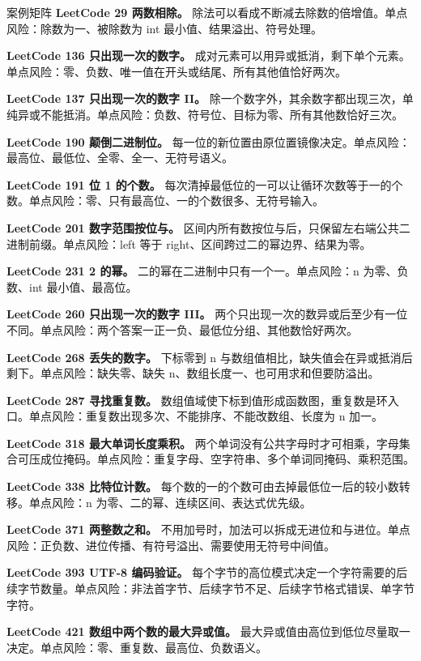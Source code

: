 \begin{principlebox}{案例矩阵}
\textbf{LeetCode 29 两数相除。}
除法可以看成不断减去除数的倍增值。单点风险：除数为一、被除数为 int 最小值、结果溢出、符号处理。

\textbf{LeetCode 136 只出现一次的数字。}
成对元素可以用异或抵消，剩下单个元素。单点风险：零、负数、唯一值在开头或结尾、所有其他值恰好两次。

\textbf{LeetCode 137 只出现一次的数字 II。}
除一个数字外，其余数字都出现三次，单纯异或不能抵消。单点风险：负数、符号位、目标为零、所有其他数恰好三次。

\textbf{LeetCode 190 颠倒二进制位。}
每一位的新位置由原位置镜像决定。单点风险：最高位、最低位、全零、全一、无符号语义。

\textbf{LeetCode 191 位 1 的个数。}
每次清掉最低位的一可以让循环次数等于一的个数。单点风险：零、只有最高位、一的个数很多、无符号输入。

\textbf{LeetCode 201 数字范围按位与。}
区间内所有数按位与后，只保留左右端公共二进制前缀。单点风险：left 等于 right、区间跨过二的幂边界、结果为零。

\textbf{LeetCode 231 2 的幂。}
二的幂在二进制中只有一个一。单点风险：n 为零、负数、int 最小值、最高位。

\textbf{LeetCode 260 只出现一次的数字 III。}
两个只出现一次的数异或后至少有一位不同。单点风险：两个答案一正一负、最低位分组、其他数恰好两次。

\textbf{LeetCode 268 丢失的数字。}
下标零到 n 与数组值相比，缺失值会在异或抵消后剩下。单点风险：缺失零、缺失 n、数组长度一、也可用求和但要防溢出。

\textbf{LeetCode 287 寻找重复数。}
数组值域使下标到值形成函数图，重复数是环入口。单点风险：重复数出现多次、不能排序、不能改数组、长度为 n 加一。

\textbf{LeetCode 318 最大单词长度乘积。}
两个单词没有公共字母时才可相乘，字母集合可压成位掩码。单点风险：重复字母、空字符串、多个单词同掩码、乘积范围。

\textbf{LeetCode 338 比特位计数。}
每个数的一的个数可由去掉最低位一后的较小数转移。单点风险：n 为零、二的幂、连续区间、表达式优先级。

\textbf{LeetCode 371 两整数之和。}
不用加号时，加法可以拆成无进位和与进位。单点风险：正负数、进位传播、有符号溢出、需要使用无符号中间值。

\textbf{LeetCode 393 UTF-8 编码验证。}
每个字节的高位模式决定一个字符需要的后续字节数量。单点风险：非法首字节、后续字节不足、后续字节格式错误、单字节字符。

\textbf{LeetCode 421 数组中两个数的最大异或值。}
最大异或值由高位到低位尽量取一决定。单点风险：零、重复数、最高位、负数语义。

\end{principlebox}

